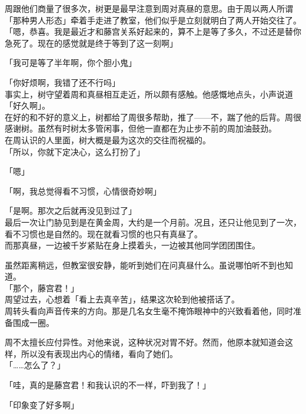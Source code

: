 周跟他们商量了很多次，树更是最早注意到周对真昼的意思。由于周以两人所谓「那种男人形态」牵着手走进了教室，他们似乎是立刻就明白了两人开始交往了。\\

「嗯，恭喜。我是最近才和藤宫关系好起来的，算不上是等了多久，不过还是替你急死了。现在的感觉就是终于等到了这一刻啊」

「我可是等了半年啊，你个胆小鬼」

「你好烦啊，我错了还不行吗」\\

事实上，树守望着周和真昼相互走近，所以颇有感触。他感慨地点头，小声说道「好久啊」。\\

在好的和不好的意义上，树都给了周很多帮助，推了——不，踹了他的后背。周很感谢树。虽然有时树太多管闲事，但他一直都在为止步不前的周加油鼓劲。\\

在周认识的人里面，树大概是最为这次的交往而祝福的。\\

「所以，你就下定决心，这么打扮了」

「嗯」

「啊，我总觉得看不习惯，心情很奇妙啊」

「是啊。那次之后就再没见到过了」\\

最后一次让门胁见到是在黄金周，大约是一个月前。况且，还只让他见到了一次，看不习惯也是自然的。现在就看习惯的也只有真昼了。\\

而那真昼，一边被千岁紧贴在身上摸着头，一边被其他同学团团围住。

虽然距离稍远，但教室很安静，能听到她们在问真昼什么。虽说哪怕听不到也知道。\\

「那个，藤宫君！」\\

周望过去，心想着「看上去真辛苦」，结果这次轮到他被搭话了。\\

周转头看向声音传来的方向。那是几名女生毫不掩饰眼神中的兴致看着他，同时准备围成一圈。

周不太擅长应付异性。对他来说，这种状况对胃不好。然而，他原本就知道会这样，所以没有表现出内心的情绪，看向了她们。\\

「……怎么了？」

「哇，真的是藤宫君！和我认识的不一样，吓到我了！」

「印象变了好多啊」

